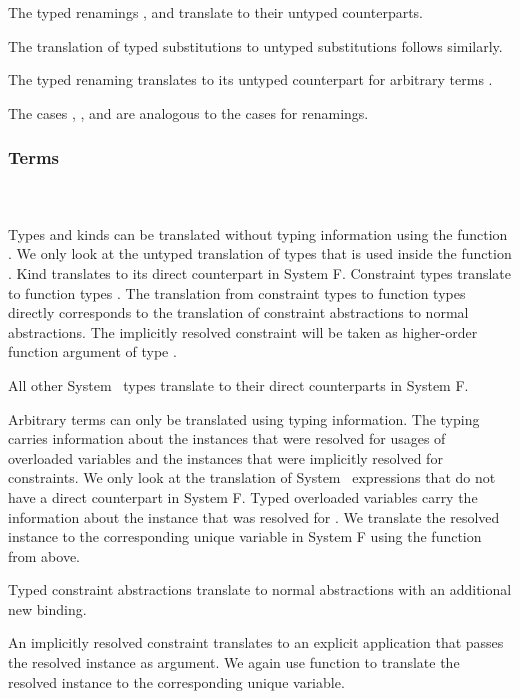 \noindent The typed renamings ,  and  translate to their untyped counterparts. 

\noindent The translation of typed substitutions to untyped substitutions follows similarly.
\DPTSub 

\noindent The typed renaming  translates to its untyped counterpart for arbitrary terms .

\noindent The cases , ,  and  are analogous to the cases for renamings. 

\subsubsection{Terms}\hfill\\\\
Types and kinds can be translated without typing information using the function .  
We only look at the untyped translation of types  that is used inside the function . Kind  translates to its direct counterpart in System F.
\DPTType
Constraint types \Constr{[}  \Constr{:}  \Constr{]⇒}  translate to function types   . 
The translation from constraint types to function types directly corresponds to the translation of constraint abstractions to normal abstractions. 
The implicitly resolved constraint will be taken as higher-order function argument of type  .

\noindent All other System \Fo\ types translate to their direct counterparts in System F.

\noindent Arbitrary terms can only be translated using typing information.
The typing carries information about the instances that were resolved for usages of overloaded variables and the instances that were implicitly resolved for constraints. 
We only look at the translation of System \Fo\ expressions that do not have a direct counterpart in System F.
\DPTTerms
Typed overloaded variables  carry the information  about the instance that was resolved for .
We translate the resolved instance to the corresponding unique variable in System F using the  function from above.

\noindent Typed constraint abstractions  translate to normal abstractions with an additional new binding. 

\noindent An implicitly resolved constraint  translates to an explicit application that passes the resolved instance  as argument. We again use function  to translate the resolved instance to the corresponding unique variable. 

